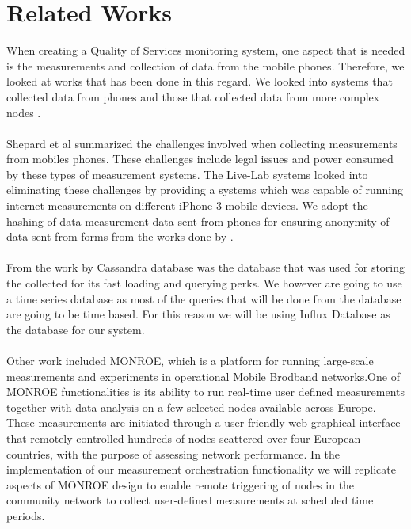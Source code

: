 \section{Related Works}
When creating a Quality of Services monitoring system, one aspect that is needed is the measurements and collection of data from the mobile phones. Therefore, we looked at works that has been done in this regard. We looked into systems that collected data from phones and those that collected data from more complex nodes \cite{7523537, Shepard:2011:LMW:1925019.1925023}. 
\paragraph{}
Shepard et al \cite{Shepard:2011:LMW:1925019.1925023} summarized the challenges involved when collecting measurements from mobiles phones. These challenges include legal issues and power consumed by these types of measurement systems. The Live-Lab systems \cite{Shepard:2011:LMW:1925019.1925023} looked into eliminating these challenges by providing a systems which was capable of running internet measurements on different iPhone 3 mobile devices. We adopt the hashing of data measurement data sent from phones for ensuring anonymity of data sent from forms from the works done by \cite{Shepard:2011:LMW:1925019.1925023}.
\paragraph{}
From the work by \cite{7523537,8255998} Cassandra database was the database that was used for storing the collected for its fast loading and querying perks. We however are going to use a time series database as most of the queries that will be done from the database are going to be time based. For this reason we will be using Influx Database as the database for our system.

\paragraph{}
Other work included MONROE, which is a platform for running large-scale measurements and experiments in operational Mobile Brodband networks\cite{7523537}.One of MONROE functionalities is its ability to run real-time user defined measurements together with data analysis on a few selected nodes available across Europe\cite{7523537}. These measurements are initiated through a user-friendly web graphical interface that remotely controlled hundreds of nodes scattered over four European countries, with the purpose of assessing network performance\cite{7523537}. In the implementation of our measurement orchestration functionality we will replicate aspects of MONROE design to enable remote triggering of nodes in the community network to collect user-defined measurements at scheduled time periods. 
